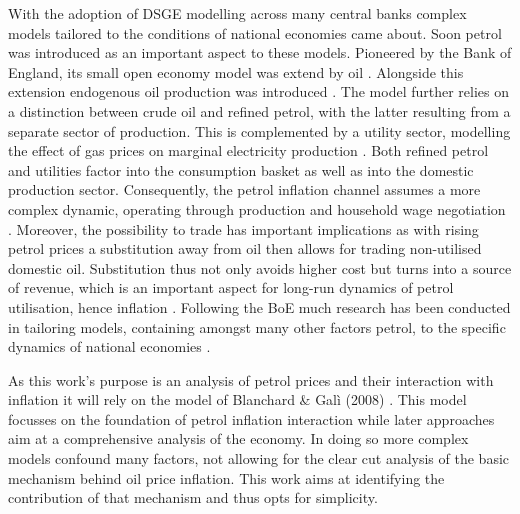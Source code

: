 \documentclass[12pt,a4paper,english]{article} %
\begin{document}
	With the adoption of DSGE modelling across many central banks complex models tailored to the conditions of national economies came about. Soon petrol was introduced as an important aspect to these models. Pioneered by the Bank of England, its small open economy model was extend by oil \cite{harrison_evaluating_2010, harrison_impact_2011}. Alongside this extension endogenous oil production was introduced \cite{harrison_impact_2011}. The model further relies on a distinction between crude oil and refined petrol, with the latter resulting from a separate sector of production. This is complemented by a utility sector, modelling the effect of gas prices on marginal electricity production \cite{harrison_impact_2011}. Both refined petrol and utilities factor into the consumption basket as well as into the domestic production sector. Consequently, the petrol inflation channel assumes a more complex dynamic, operating through production and household wage negotiation \cite{harrison_impact_2011}. Moreover, the possibility to trade has important implications as with rising petrol prices a substitution away from oil then allows for trading non-utilised domestic oil. Substitution thus not only avoids higher cost but turns into a source of revenue, which is an important aspect for long-run dynamics of petrol utilisation, hence inflation \cite{harrison_impact_2011}. Following the BoE much research has been conducted in tailoring models, containing amongst many other factors petrol, to the specific dynamics of national economies \cite{lees_introducing_2009, malakhovskaya_are_2014, hou_oil_2016}. 
	
	As this work's purpose is an analysis of petrol prices and their interaction with inflation it will rely on the model of Blanchard \& Galì (2008) \cite{blanchard_macroeconomic_2007}. This model focusses on the foundation of petrol inflation interaction while later approaches aim at a comprehensive analysis of the economy. In doing so more complex models confound many factors, not allowing for the clear cut analysis of the basic mechanism behind oil price inflation. This work aims at identifying the contribution of that mechanism and thus opts for simplicity. 
	
\end{document}
